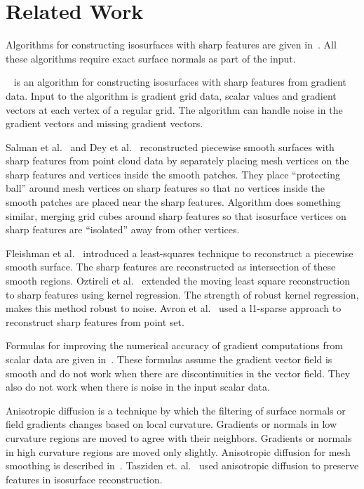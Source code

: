 
\section{Related Work}

Algorithms for constructing isosurfaces with sharp features
are given
in~\cite{ab-fpmmo-03,hwco-cmsaf-05,jlsw-dchd-02,kbsh-fssev-01,
ms-ispmg-10,sw-dcss-02,sw-dmcpc-04,Varadhan:2003:fss,zhk-dctps-04}.
All these algorithms require
exact surface normals as part of the input.

\MergeSharp~\cite{bw-cisec-13} is an algorithm
for constructing isosurfaces with sharp features from gradient data.
Input to the algorithm is gradient grid data,
scalar values and gradient vectors at each vertex of a regular grid.
The algorithm can handle noise in the gradient vectors 
and missing gradient vectors.

Salman et al.~\cite{sym-fpmg-10} and Dey et al.~\cite{dgqsww-fprss-12}
reconstructed piecewise smooth surfaces with sharp features 
from point cloud data
by separately placing mesh vertices on the sharp features
and vertices inside the smooth patches.
They place ``protecting ball'' around mesh vertices on sharp features
so that no vertices inside the smooth patches are placed 
near the sharp features.
Algorithm \MergeSharp does something similar,
merging grid cubes around sharp features so that isosurface vertices
on sharp features are ``isolated'' away from other vertices.

Fleishman et al.~\cite{fcs-rmlsf-2005} introduced a least-squares technique to reconstruct a piecewise smooth surface. The sharp features are reconstructed as intersection of these smooth regions. Oztireli et al.~\cite{Oeztireli2009} extended the moving least square reconstruction to sharp features using kernel regression. The strength of robust kernel regression, makes this method robust to noise. Avron et al.~\cite{avron2010L} used a l1-sparse approach to reconstruct sharp features from point set.

Formulas for improving the numerical accuracy of gradient computations
from scalar data
are given in~\cite{aml-ger-10,ham-thqge-11,mmmy-cnes-97}.
These formulas assume the gradient vector field is smooth
and do not work when there are discontinuities in the vector field.
They also do not work when there is noise in the input scalar data.

Anisotropic diffusion is a technique by which the filtering
of surface normals or field gradients changes based on local curvature.
Gradients or normals in low curvature regions are moved to agree 
with their neighbors.
Gradients or normals in high curvature regions are moved only slightly.
Anisotropic diffusion for mesh smoothing is described
in~\cite{bx-adsfs-03,cdr-agdsp-00,twbo-gssad-02,twbo-gspnm-03}.
Tasziden et. al.~\cite{tw-adsnf-03} used anisotropic diffusion 
to preserve features in isosurface reconstruction.

